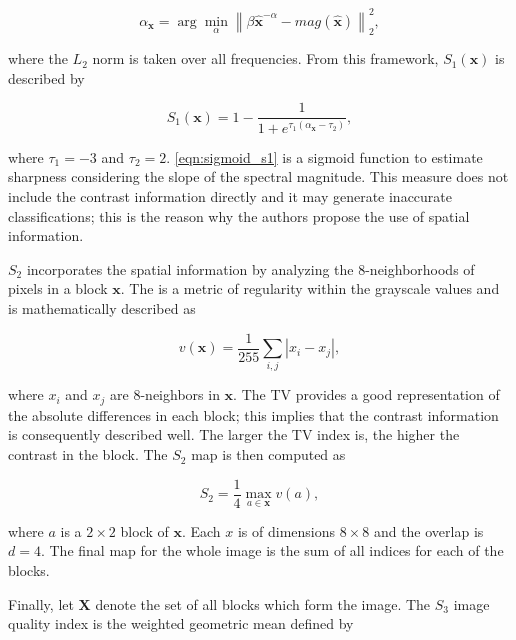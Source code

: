 \begin{equation}
\label{eqn:slope_of_magnitude}
\alpha_{\mathbf{x}} = \arg \min_{\alpha} \left\lVert \beta \hat{\mathbf{x}}^{-\alpha} -  mag(\hat{\mathbf{x}}) \right\rVert^{2}_{2},
\end{equation}

\noindent where the $L_{2}$ norm is taken over all frequencies. From this framework, $S_{1}(\mathbf{x})$ is described by

\begin{equation}
\label{eqn:sigmoid_s1}
S_{1}(\mathbf{x}) = 1 - \frac{1}{1 + e^{\tau_{1}
(\alpha_{\mathbf{x}} - \tau_{2})}},
\end{equation}

\noindent where $\tau_{1} = -3$ and $\tau_{2} = 2$. \autoref{eqn:sigmoid_s1} is a sigmoid function to estimate sharpness considering the slope of the spectral magnitude. This measure does not include the contrast information directly and it may generate inaccurate classifications; this is the reason why the authors propose the use of spatial information.

$S_{2}$ incorporates the spatial information by analyzing the 8-neighborhoods of pixels in a block $\mathbf{x}$. The  is a metric of regularity within the grayscale values and is mathematically described as

\begin{equation}
\label{eqn:total_variation}
v(\mathbf{x}) = \frac{1}{255}\sum_{i,j}\left|x_{i} - x_{j}\right|,
\end{equation}

\noindent where $x_{i}$ and $x_{j}$ are 8-neighbors in $\mathbf{x}$. The TV provides a good representation of the absolute differences in each block; this implies that the contrast information is consequently described well. The larger the TV index is, the higher the contrast in the block. The $S_{2}$ map is then computed as

\begin{equation}
\label{eqn:spatial_s2}
S_{2} = \frac{1}{4} \max_{a \in \mathbf{x}} v(a),
\end{equation}

\noindent where $a$ is a $2 \times 2$ block of $\mathbf{x}$. Each $x$ is of dimensions $8 \times 8$ and the overlap is $d = 4$. The final map for the whole image is the sum of all indices for each of the blocks.

Finally, let $\mathbf{X}$ denote the set of all blocks which form the image. The $S_{3}$ image quality index is the weighted geometric mean defined by

